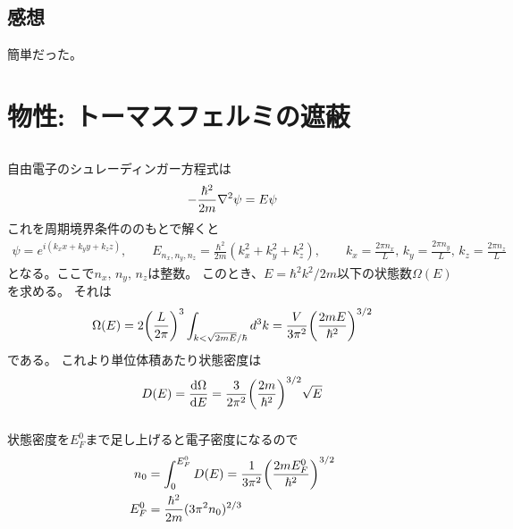 \documentclass[../../master.tex]{subfiles}
\begin{document}
\section*{感想}
簡単だった。


\chapter{物性: トーマスフェルミの遮蔽}
\section{}
\subsection{}
自由電子のシュレーディンガー方程式は
\begin{align}
    -\frac{\hbar^2}{2m}\laplacian \psi = E\psi
\end{align}
これを周期境界条件ののもとで解くと
\begin{align}
    \psi = e^{i(k_x x+k_y y+k_z z)},\qquad
    E_{n_x,n_y,n_z} = \frac{\hbar^2}{2m}(k_x^2+k_y^2+k_z^2),\qquad
    k_x = \frac{2\pi n_x}{L},\,k_y = \frac{2\pi n_y}{L},\,k_z = \frac{2\pi n_z}{L}
\end{align}
となる。ここで\(n_x,\,n_y,\,n_z\)は整数。
このとき、\(E=\hbar^2k^2/2m\)以下の状態数\(\Omega(E)\)を求める。
それは
\begin{align}
    \Omega(E) = 2\qty(\frac{L}{2\pi})^3\int_{k<\sqrt{2mE}/\hbar}d^3k
    = \frac{V}{3\pi^2}\qty(\frac{2mE}{\hbar^2})^{3/2}
\end{align}
である。
これより単位体積あたり状態密度は
\begin{align}
    D(E) = \dv{\Omega}{E} = \frac{3}{2\pi^2}\qty(\frac{2m}{\hbar^2})^{3/2}\sqrt{E}
\end{align}

\subsection{}
状態密度を\(E_F^0\)まで足し上げると電子密度になるので
\begin{align}
    n_0 &= \int_{0}^{E_F^0} D(E) = \frac{1}{3\pi^2}\qty(\frac{2mE_F^0}{\hbar^2})^{3/2}\\
    E_F^0 &=\frac{\hbar^2}{2m}(3\pi^2n_0)^{2/3}
\end{align}

\section{}
\end{document}
